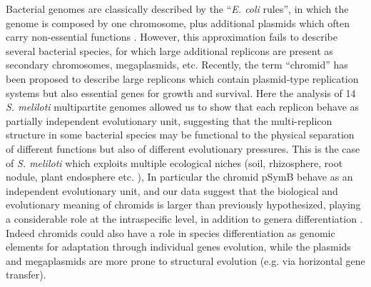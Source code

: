 Bacterial genomes are classically described by the “\textit{E. coli} rules”, in which the genome is composed by one chromosome, plus additional plasmids which often carry non-essential functions \cite{krawiec1990organization}. However, this approximation fails to describe several bacterial species, for which large additional replicons are present as secondary chromosomes, megaplasmids, etc. Recently, the term “chromid” has been proposed \cite{harrison2010introducing} to describe large replicons which contain plasmid-type replication systems but also essential genes for growth and survival. 
Here the analysis of 14 \textit{S. meliloti} multipartite genomes allowed us to show that each replicon behave as partially independent evolutionary unit, suggesting that the multi-replicon structure in some bacterial species may be functional to the physical separation of different functions but also of different evolutionary pressures. This is the case of \textit{S. meliloti} which exploits multiple ecological niches (soil, rhizosphere, root nodule, plant endosphere etc. \cite{pini2012exploring}), In particular the chromid pSymB behave as an independent evolutionary unit, and our data suggest that the biological and evolutionary meaning of chromids is larger than previously hypothesized, playing a considerable role at the intraspecific level, in addition to genera differentiation \cite{harrison2010introducing}. Indeed chromids could also have a role in species differentiation as genomic elements for adaptation through individual genes evolution, while the plasmids and megaplasmids are more prone to structural evolution (e.g. via horizontal gene transfer). 
